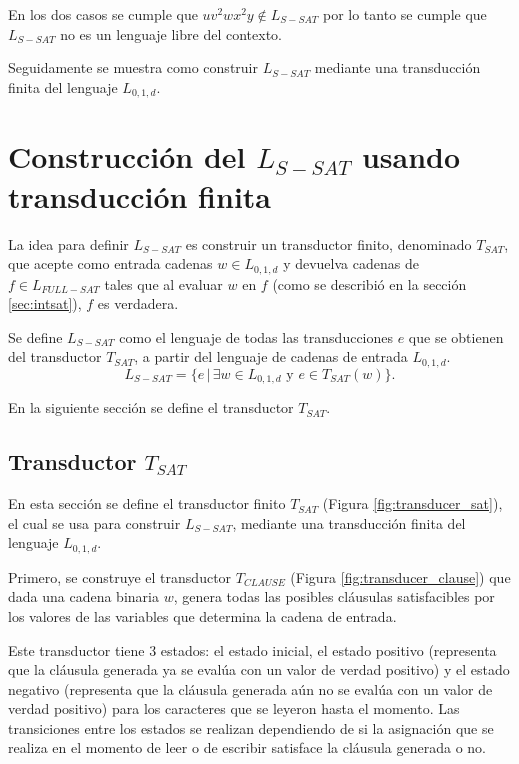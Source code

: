En los dos casos se cumple que $uv^2wx^2y\notin L_{S-SAT}$ por lo tanto se cumple que $L_{S-SAT}$ no es un lenguaje libre del contexto.

Seguidamente se muestra como construir $L_{S-SAT}$ mediante una transducción finita del lenguaje $L_{0,1,d}$.

\section{Construcción del $L_{S-SAT}$ usando transducción finita}

La idea para definir $L_{S-SAT}$ es construir un transductor finito, denominado $T_{SAT}$, que acepte como 
entrada cadenas $w\in L_{0,1,d}$ y devuelva cadenas de $f\in L_{FULL-SAT}$ tales que al evaluar $w$ en $f$ (como se describió en la sección \ref{sec:intsat}), $f$ es verdadera.

Se define $L_{S-SAT}$ como el lenguaje de todas las transducciones $e$ que se obtienen del transductor
$T_{SAT}$, a partir del lenguaje de cadenas de entrada $L_{0,1,d}$.
$$L_{S-SAT} = \{e\,|\,\exists w \in L_{0,1,d} \text{ y } e \in T_{SAT}(w) \}.$$

En la siguiente sección se define el transductor $T_{SAT}$.

\subsection{Transductor $T_{SAT}$}
\label{sec:tsat}

En esta sección se define el transductor finito $T_{SAT}$ (Figura \ref{fig:transducer_sat}), el cual se usa para construir $L_{S-SAT}$, mediante una transducción finita del lenguaje $L_{0,1,d}$.

Primero, se construye el transductor $T_{CLAUSE}$ (Figura \ref{fig:transducer_clause}) que dada una cadena binaria $w$, genera todas las posibles cláusulas satisfacibles por los valores de las variables que determina la cadena de entrada.

Este transductor tiene 3 estados: el estado inicial, el estado positivo (representa que la cláusula generada ya se evalúa con un valor de verdad positivo) y el estado negativo (representa que la cláusula generada aún no se evalúa con un valor de verdad positivo) para los caracteres que se leyeron hasta el momento. Las transiciones entre los estados se realizan dependiendo de si la asignación que se realiza en el momento de leer o de escribir satisface la cláusula generada o no.

